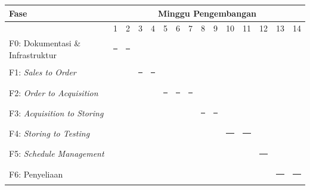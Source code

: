 \begin{tabular}{|l|p{0.45cm}|p{0.45cm}|p{0.45cm}|p{0.45cm}|p{0.45cm}|p{0.45cm}|p{0.45cm}|p{0.45cm}|p{0.45cm}|p{0.45cm}|p{0.45cm}|p{0.45cm}|p{0.45cm}|p{0.45cm}|}
\hline
\textbf{Fase} & \multicolumn{14}{c|}{\textbf{Minggu Pengembangan}} \\
\hline
 & 1 & 2 & 3 & 4 & 5 & 6 & 7 & 8 & 9 & 10 & 11 & 12 & 13 & 14 \\
\hline
F0: Dokumentasi \& Infrastruktur & \rule{0.45cm}{0.4cm} & \rule{0.45cm}{0.4cm} & & & & & & & & & & & & \\
\hline
F1: \textit{Sales to Order} & & & \rule{0.45cm}{0.4cm} & \rule{0.45cm}{0.4cm} & & & & & & & & & & \\
\hline
F2: \textit{Order to Acquisition} & & & & & \rule{0.45cm}{0.4cm} & \rule{0.45cm}{0.4cm} & \rule{0.45cm}{0.4cm} & & & & & & & \\
\hline
F3: \textit{Acquisition to Storing} & & & & & & & & \rule{0.45cm}{0.4cm} & \rule{0.45cm}{0.4cm} & & & & & \\
\hline
F4: \textit{Storing to Testing} & & & & & & & & & & \rule{0.45cm}{0.4cm} & \rule{0.45cm}{0.4cm} & & & \\
\hline
F5: \textit{Schedule Management} & & & & & & & & & & & & \rule{0.45cm}{0.4cm} & & \\
\hline
F6: Penyeliaan & & & & & & & & & & & & & \rule{0.45cm}{0.4cm} & \rule{0.45cm}{0.4cm} \\
\hline
\end{tabular}
